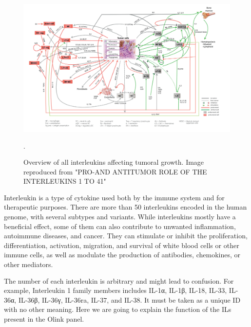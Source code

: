 






    \begin{figure}[h!]
        \centering
            \includegraphics[width=0.8\linewidth]{figures/Inflammation/ILHell.png} 
        \caption{Overview of all interleukins affecting tumoral growth. Image reproduced from "PRO-AND ANTITUMOR ROLE OF THE INTERLEUKINS 1 TO 41" \cite{bigTumorFigureBook}}.
        \label{figure:ilhell}
    \end{figure}

Interleukin is a type of cytokine used both by the immune system and for therapeutic purposes. There are more than 50 interleukins encoded in the human genome, with several subtypes and variants. While interleukins mostly have a beneficial effect, some of them can also contribute to unwanted inflammation, autoimmune diseases, and cancer. They can stimulate or inhibit the proliferation, differentiation, activation, migration, and survival of white blood cells or other immune cells, as well as modulate the production of antibodies, chemokines, or other mediators.

The number of each interleukin is arbitrary and might lead to confusion. For example, Interleukin 1 family members includes IL-1α, IL-1β, IL-18, IL-33, IL-36α, IL-36β, IL-36γ, IL-36ra, IL-37, and IL-38. It must be taken as a unique ID with no other meaning. Here we are going to explain the function of the ILs present in the Olink panel.

